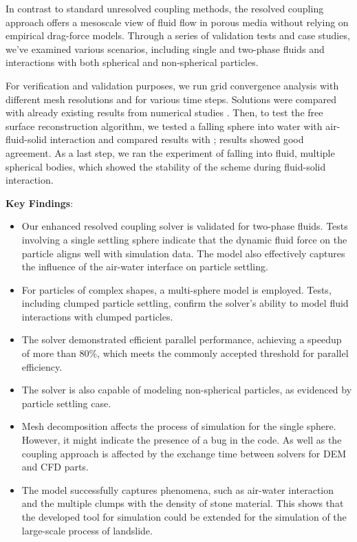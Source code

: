 In contrast to standard unresolved coupling methods, the resolved coupling approach offers a mesoscale view of fluid flow in porous media without relying on empirical drag-force models. Through a series of validation tests and case studies, we've examined various scenarios, including single and two-phase fluids and interactions with both spherical and non-spherical particles.

For verification and validation purposes, we run grid convergence analysis with different mesh resolutions and for various time steps. Solutions were compared with already existing results from numerical studies \cite{nan2023high}. Then, to test the free surface reconstruction algorithm, we tested a falling sphere into water with air-fluid-solid interaction and compared results with \cite{pathak20163d}; results showed good agreement. As a last step, we ran the experiment of falling into fluid, multiple spherical bodies, which showed the stability of the scheme during fluid-solid interaction.

\textbf{Key Findings}:
\begin{itemize}
    \item Our enhanced resolved coupling solver is validated for two-phase fluids. Tests involving a single settling sphere indicate that the dynamic fluid force on the particle aligns well with simulation data. The model also effectively captures the influence of the air-water interface on particle settling.
    \item For particles of complex shapes, a multi-sphere model is employed. Tests, including clumped particle settling, confirm the solver's ability to model fluid interactions with clumped particles.
   \item The solver demonstrated efficient parallel performance, achieving a speedup of more than 80\%, which meets the commonly accepted threshold for parallel efficiency.
    \item The solver is also capable of modeling non-spherical particles, as evidenced by particle settling case.
    \item Mesh decomposition affects the process of simulation for the single sphere. However, it might indicate the presence of a bug in the code. As well as the coupling approach is affected by the exchange time between solvers for DEM and CFD parts.
    \item The model successfully captures phenomena, such as air-water interaction and the multiple clumps with the density of stone material. This shows that the developed tool for simulation could be extended for the simulation of the large-scale process of landslide.
\end{itemize}

